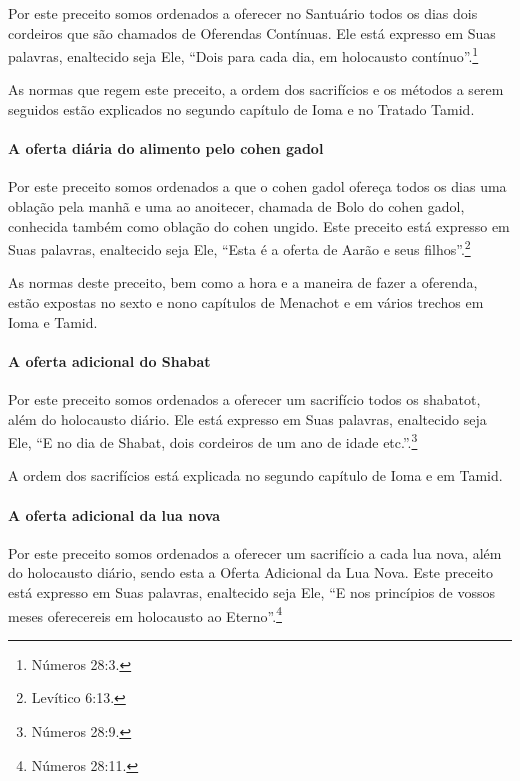 \begin{multicols}{2}
Por este preceito somos ordenados a oferecer no Santuário todos os dias
dois cordeiros que são chamados de Oferendas Contínuas. Ele está
expresso em Suas palavras, enaltecido seja Ele, ``Dois para cada dia,
em holocausto contínuo''.\footnote{Números 28:3.}

As normas que regem este preceito, a ordem dos sacrifícios e os métodos
a serem seguidos estão explicados no segundo capítulo de Ioma\starr{} e no
Tratado Tamid\starr.

\paragraph{A oferta diária do alimento pelo cohen gadol\starr{}}

Por este preceito somos ordenados a que o cohen gadol\starr{} ofereça todos
os dias uma oblação pela manhã e uma ao anoitecer, chamada de Bolo
do cohen gadol\starr{}, conhecida também como oblação do cohen\starr{} ungido.
Este preceito está expresso em Suas palavras, enaltecido seja Ele,
``Esta é a oferta de Aarão e seus filhos''.\footnote{Levítico 6:13.}

As normas deste preceito, bem como a hora e a maneira de fazer a
oferenda, estão expostas no sexto e nono capítulos de Menachot\starr{} e em
vários trechos em Ioma\starr{} e Tamid\starr.

\paragraph{A oferta adicional do Shabat}

Por este preceito somos ordenados a oferecer um sacrifício todos os
shabatot\starr, além do holocausto diário. Ele está expresso em Suas palavras,
enaltecido seja Ele, ``E no dia de Shabat, dois cordeiros de um ano de
idade etc.''.\footnote{Números 28:9.}

A ordem dos sacrifícios está explicada no segundo capítulo de Ioma\starr{} e em
Tamid\starr.

\paragraph{A oferta adicional da lua nova}

Por este preceito somos ordenados a oferecer um sacrifício a cada lua
nova, além do holocausto diário, sendo esta a Oferta Adicional da Lua
Nova. Este preceito está expresso em Suas palavras, enaltecido seja
Ele, ``E nos princípios de vossos meses oferecereis em holocausto ao
Eterno''.\footnote{Números 28:11.}


\end{multicols}
